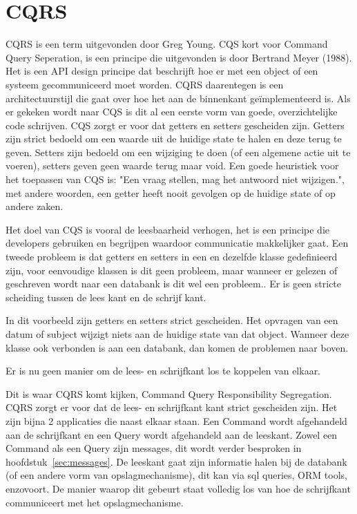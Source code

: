 
\chapter{CQRS}
\label{ch:CQRS}

CQRS is een term uitgevonden door Greg Young. CQS kort voor Command Query Seperation, is een principe die uitgevonden is door Bertrand Meyer (1988). Het is een API design principe dat beschrijft hoe er met een object of een systeem gecommuniceerd moet worden. CQRS daarentegen is een architectuurstijl die gaat over hoe het aan de binnenkant geïmplementeerd is. Als er gekeken wordt naar CQS is dit al een eerste vorm van goede, overzichtelijke code schrijven. CQS zorgt er voor dat getters en setters gescheiden zijn. Getters zijn strict bedoeld om een waarde uit de huidige state te halen en deze terug te geven. Setters zijn bedoeld om een wijziging te doen (of een algemene actie uit te voeren), setters geven geen waarde terug maar void. Een goede heuristiek voor het toepassen van CQS is: "Een vraag stellen, mag het antwoord niet wijzigen.", met andere woorden, een getter heeft nooit gevolgen op de huidige state of op andere zaken.

Het doel van CQS is vooral de leesbaarheid verhogen, het is een principe die developers gebruiken en begrijpen waardoor communicatie makkelijker gaat.
Een tweede probleem is dat getters en setters in een en dezelfde klasse gedefinieerd zijn, voor eenvoudige klassen is dit geen probleem, maar wanneer er gelezen of geschreven wordt naar een databank is dit wel een probleem.. Er is geen stricte scheiding tussen de lees kant en de schrijf kant.


In dit voorbeeld zijn getters en setters strict gescheiden. Het opvragen van een datum of subject wijzigt niets aan de huidige state van dat object. Wanneer deze klasse ook verbonden is aan een databank, dan komen de problemen naar boven.


Er is nu geen manier om de lees- en schrijfkant los te koppelen van elkaar.

Dit is waar CQRS komt kijken, Command Query Responsibility Segregation. CQRS zorgt er voor dat de lees- en schrijfkant kant strict gescheiden zijn. Het zijn bijna 2 applicaties die naast elkaar staan. Een Command wordt afgehandeld aan de schrijfkant en een Query wordt afgehandeld aan de leeskant. Zowel een Command als een Query zijn messages, dit wordt verder besproken in hoofdstuk~\ref{sec:messages}. De leeskant gaat zijn informatie halen bij de databank (of een andere vorm van opslagmechanisme), dit kan via sql queries, ORM tools, enzovoort. De manier waarop dit gebeurt staat volledig los van hoe de schrijfkant communiceert met het opslagmechanisme. 

